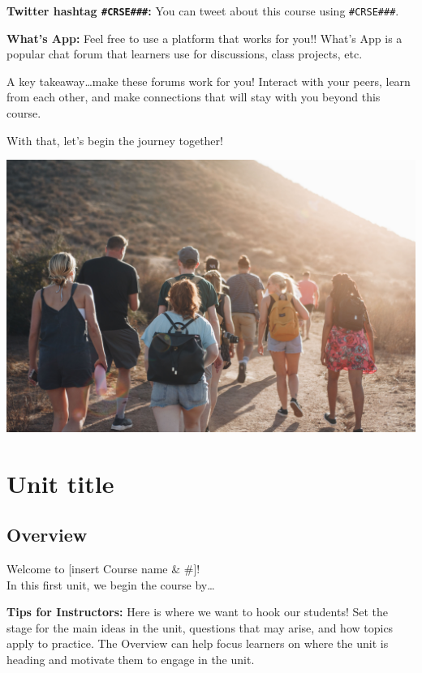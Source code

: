 \documentclass[
]{book}
\begin{document}
\textbf{Twitter hashtag \texttt{\#CRSE\#\#\#}:} You can tweet about this course using \texttt{\#CRSE\#\#\#}.

\textbf{What's App:} Feel free to use a platform that works for you!! What's App is a popular chat forum that learners use for discussions, class projects, etc.

A key takeaway\ldots make these forums work for you! Interact with your peers, learn from each other, and make connections that will stay with you beyond this course.

With that, let's begin the journey together!

\includegraphics{assets/community/luke-porter-NEqEC7qa9FM-unsplash.jpg}

\hypertarget{unit-title}{%
\chapter{Unit title}\label{unit-title}}

\hypertarget{overview}{%
\section*{Overview}\label{overview}}

Welcome to {[}insert Course name \& \#{]}!\\
In this first unit, we begin the course by\ldots{}

\begin{feedback}
\textbf{Tips for Instructors:} Here is where we want to hook our
students! Set the stage for the main ideas in the unit, questions that
may arise, and how topics apply to practice. The Overview can help focus
learners on where the unit is heading and motivate them to engage in the
unit.
\end{feedback}
\end{document}
